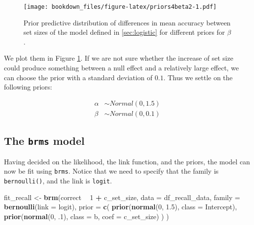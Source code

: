 \documentclass[12pt,]{krantz}
\newenvironment{Shaded}{\begin{snugshade}}{\end{snugshade}}
\newcommand{\DataTypeTok}[1]{\textcolor[rgb]{0.13,0.29,0.53}{#1}}
\newcommand{\DecValTok}[1]{\textcolor[rgb]{0.00,0.00,0.81}{#1}}
\newcommand{\FloatTok}[1]{\textcolor[rgb]{0.00,0.00,0.81}{#1}}
\newcommand{\KeywordTok}[1]{\textcolor[rgb]{0.13,0.29,0.53}{\textbf{#1}}}
\newcommand{\NormalTok}[1]{#1}
\newcommand{\OperatorTok}[1]{\textcolor[rgb]{0.81,0.36,0.00}{\textbf{#1}}}
\newcommand{\StringTok}[1]{\textcolor[rgb]{0.31,0.60,0.02}{#1}}
\theoremstyle{definition}
\theoremstyle{definition}
\theoremstyle{definition}
\theoremstyle{remark}
\begin{document}
\begin{figure}
\centering
\texttt{[image: bookdown\_files/figure-latex/priors4beta2-1.pdf]}
\caption{\label{fig:priors4beta2}Prior predictive distribution of differences in mean accuracy between set sizes of the model defined in \ref{sec:logistic} for different priors for \(\beta\).}
\end{figure}

We plot them in Figure \ref{fig:priors4beta2}. If we are not sure whether the increase of set size could produce something between a null effect and a relatively large effect, we can choose the prior with a standard deviation of \(0.1\). Thus we settle on the following priors:

\begin{equation}
\begin{aligned}
\alpha &\sim Normal(0, 1.5) \\
\beta &\sim Normal(0, 0.1) 
\end{aligned}
\end{equation}

\hypertarget{the-brms-model-2}{%
\subsection{\texorpdfstring{The \texttt{brms} model}{The brms model}}\label{the-brms-model-2}}

Having decided on the likelihood, the link function, and the priors, the model can now be fit using \texttt{brms}. Notice that we need to specify that the family is \texttt{bernoulli()}, and the link is \texttt{logit}.

\begin{Shaded}
\begin{Highlighting}[]
\NormalTok{fit_recall <-}\StringTok{ }\KeywordTok{brm}\NormalTok{(correct }\OperatorTok{~}\StringTok{ }\DecValTok{1} \OperatorTok{+}\StringTok{ }\NormalTok{c_set_size,}
  \DataTypeTok{data =}\NormalTok{ df_recall_data,}
  \DataTypeTok{family =} \KeywordTok{bernoulli}\NormalTok{(}\DataTypeTok{link =}\NormalTok{ logit),}
  \DataTypeTok{prior =} \KeywordTok{c}\NormalTok{(}
    \KeywordTok{prior}\NormalTok{(}\KeywordTok{normal}\NormalTok{(}\DecValTok{0}\NormalTok{, }\FloatTok{1.5}\NormalTok{), }\DataTypeTok{class =}\NormalTok{ Intercept),}
    \KeywordTok{prior}\NormalTok{(}\KeywordTok{normal}\NormalTok{(}\DecValTok{0}\NormalTok{, }\FloatTok{.1}\NormalTok{), }\DataTypeTok{class =}\NormalTok{ b, }\DataTypeTok{coef =}\NormalTok{ c_set_size)}
\NormalTok{  )}
\NormalTok{)}
\end{Highlighting}
\end{Shaded}
\end{document}
